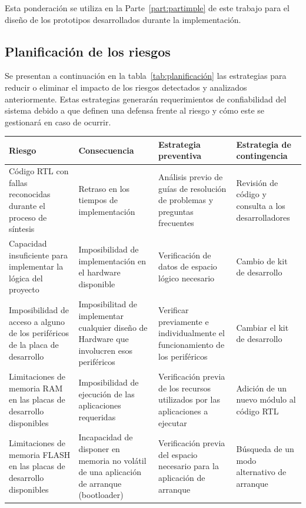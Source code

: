 	    Esta ponderación se utiliza en la Parte~\ref{part:partimple} de este trabajo para el diseño de los prototipos desarrollados durante la
	    implementación.
	    
		\newpage
		\subsection{Planificación de los riesgos}	

Se presentan a continuación en la tabla~\ref {tab:planificación} las estrategias para reducir o eliminar el impacto de los riesgos detectados y analizados anteriormente. Estas estrategias generarán requerimientos de confiabilidad del sistema debido a que definen una defensa frente al riesgo y cómo este se gestionará en caso de ocurrir.
	
        \begin{table}[!h]
		\centering
		\begin{tabular}{ p{4cm} p{4cm} p{4cm} p{3cm} }
		\hline 
		\rowcolor[gray]{0.8} Riesgo & Consecuencia & Estrategia preventiva & Estrategia de contingencia\\
		\hline
		Código RTL con fallas reconocidas durante el proceso de síntesis& Retraso en los tiempos de implementación & Análisis previo de guías de resolución de problemas y preguntas frecuentes & Revisión de código y consulta a los desarrolladores \\
		\hline
		 Capacidad insuficiente para implementar la lógica del proyecto & Imposibilidad de implementación en el hardware disponible  & Verificación de datos de espacio lógico necesario  & Cambio de kit de desarrollo\\	 
		\hline
		 Imposibilidad de acceso a alguno de los periféricos de la placa de desarrollo & Imposibilitad de implementar cualquier diseño de Hardware que involucren esos periféricos& Verificar previamente e individualmente el funcionamiento de los periféricos & Cambiar el kit de desarrollo\\
		\hline
		Limitaciones de memoria RAM en las placas de desarrollo disponibles& Imposibilidad de ejecución de las aplicaciones requeridas & Verificación previa de los recursos utilizados por las aplicaciones a ejecutar & Adición de un nuevo módulo al código RTL  \\	 
		\hline
		Limitaciones de memoria FLASH en las placas de desarrollo disponibles& Incapacidad de disponer en memoria no volátil de una aplicación de arranque (bootloader) & Verificación previa del espacio necesario para la aplicación de arranque & Búsqueda de un modo alternativo de arranque\\ 

\end{tabular}
\end{table}
